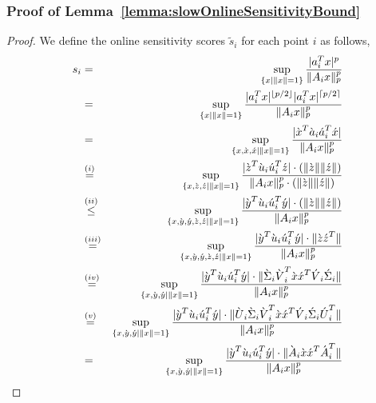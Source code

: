 \subsubsection{Proof of Lemma~\ref{lemma:slowOnlineSensitivityBound}}
\begin{proof}{\label{proof:slowOnlineSensitivityBound}}
 We define the online sensitivity scores $\tilde{s}_{i}$ for each point $i$ as follows,
  \allowdisplaybreaks
  \begin{eqnarray*}
  s_{i} &=& \sup_{\{\*x\mid\|\*x\|=1\}}\frac{|\*a_{i}^{T}\*x|^{p}}{\|\*A_{i}\*x\|_{p}^{p}}\\
  &=&\sup_{\{\*x\mid\|\*x\|=1\}}\frac{|\*a_{i}^{T}\*x|^{\lfloor p/2 \rfloor}|\*a_{i}^{T}\*x|^{\lceil p/2 \rceil}}{\|\*A_{i}\*x\|_{p}^{p}} \\
  &=& \sup_{\{\*x,\grave{\*x},\acute{\*x}\mid\|\*x\|=1\}}\frac{|\grave{\*x}^{T}\grave{\*a}_{i}\acute{\*a}_{i}^{T}\acute{\*x}|}{\|\*A_{i}\*x\|_{p}^{p}} \\
  &\stackrel{(i)}=& \sup_{\{\*x,\grave{\*z},\acute{\*z}\mid\|\*x\|=1\}}\frac{|\grave{\*z}^{T}\grave{\*u}_{i}\acute{\*u}_{i}^{T}\acute{\*z}|\cdot(\|\grave{\*z}\|\|\acute{\*z}\|)}{\|\*A_{i}\*x\|_{p}^{p}\cdot(\|\grave{\*z}\|\|\acute{\*z}\|)} \\
  &\stackrel{(ii)}\leq& \sup_{\{\*x,\grave{\*y},\acute{\*y},\grave{\*z},\acute{\*z}\mid\|\*x\|=1\}}\frac{|\grave{\*y}^{T}\grave{\*u}_{i}\acute{\*u}_{i}^{T}\acute{\*y}|\cdot(\|\grave{\*z}\|\|\acute{\*z}\|)}{\|\*A_{i}\*x\|_{p}^{p}} \\
  &\stackrel{(iii)}=& \sup_{\{\*x,\grave{\*y},\acute{\*y},\grave{\*z},\acute{\*z}\mid\|\*x\|=1\}}\frac{|\grave{\*y}^{T}\grave{\*u}_{i}\acute{\*u}_{i}^{T}\acute{\*y}|\cdot\|\grave{\*z}\acute{\*z}^{T}\|}{\|\*A_{i}\*x\|_{p}^{p}} \\
  &\stackrel{(iv)}=& \sup_{\{\*x,\grave{\*y},\acute{\*y}\mid\|\*x\|=1\}}\frac{|\grave{\*y}^{T}\grave{\*u}_{i}\acute{\*u}_{i}^{T}\acute{\*y}|\cdot\|\grave{\Sigma}_{i}\grave{\*V}_{i}^{T}\grave{\*x}\acute{\*x}^{T}\acute{\*V}_{i}\acute{\Sigma}_{i}\|}{\|\*A_{i}\*x\|_{p}^{p}} \\
  &\stackrel{(v)}=& \sup_{\{\*x,\grave{\*y},\acute{\*y}\mid\|\*x\|=1\}}\frac{|\grave{\*y}^{T}\grave{\*u}_{i}\acute{\*u}_{i}^{T}\acute{\*y}| \cdot\|\grave{\*U}_{i}\grave{\Sigma}_{i}\grave{\*V}_{i}^{T}\grave{\*x}\acute{\*x}^{T}\acute{\*V}_{i}\acute{\Sigma}_{i}\acute{\*U}_{i}^{T}\|}{\|\*A_{i}\*x\|_{p}^{p}} \\
  &=& \sup_{\{\*x,\grave{\*y},\acute{\*y}\mid\|\*x\|=1\}}\frac{|\grave{\*y}^{T}\grave{\*u}_{i}\acute{\*u}_{i}^{T}\acute{\*y}|\cdot\|\grave{\*A}_{i}\grave{\*x}\acute{\*x}^{T}\acute{\*A}_{i}^{T}\|}{\|\*A_{i}\*x\|_{p}^{p}} \\

\end{eqnarray*}
\end{proof}
